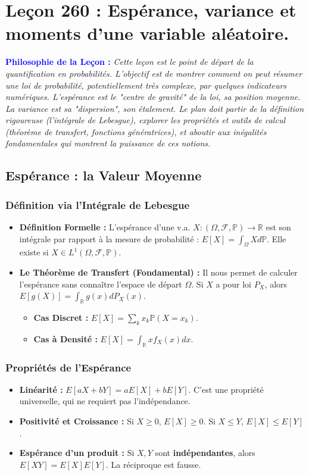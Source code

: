 \documentclass[12pt, a4paper, parskip=full]{report}
\theoremstyle{agregstyle}
\newenvironment{philosophie}
  {\par\medskip\noindent\begin{oframed}\noindent\textbf{\textcolor{blue}{Philosophie de la Leçon :}}\itshape}
  {\end{oframed}\par\medskip}
\begin{document}
\chapter{Leçon 260 : Espérance, variance et moments d'une variable aléatoire.}

\begin{philosophie}
    Cette leçon est le point de départ de la quantification en probabilités. L'objectif est de montrer comment on peut résumer une loi de probabilité, potentiellement très complexe, par quelques indicateurs numériques. L'espérance est le "centre de gravité" de la loi, sa position moyenne. La variance est sa "dispersion", son étalement. Le plan doit partir de la définition rigoureuse (l'intégrale de Lebesgue), explorer les propriétés et outils de calcul (théorème de transfert, fonctions génératrices), et aboutir aux inégalités fondamentales qui montrent la puissance de ces notions.
\end{philosophie}

\section{Espérance : la Valeur Moyenne}
\subsection{Définition via l'Intégrale de Lebesgue}
\begin{itemize}
    \item \textbf{Définition Formelle :} L'espérance d'une v.a. $X: (\Omega, \mathcal{F}, \mathbb{P}) \to \mathbb{R}$ est son intégrale par rapport à la mesure de probabilité : $E[X] = \int_\Omega X d\mathbb{P}$. Elle existe si $X \in L^1(\Omega, \mathcal{F}, \mathbb{P})$.
    \item \textbf{Le Théorème de Transfert (Fondamental) :} Il nous permet de calculer l'espérance sans connaître l'espace de départ $\Omega$. Si $X$ a pour loi $P_X$, alors $E[g(X)] = \int_\mathbb{R} g(x) dP_X(x)$.
        \begin{itemize}
            \item \textbf{Cas Discret :} $E[X] = \sum_k x_k \mathbb{P}(X=x_k)$.
            \item \textbf{Cas à Densité :} $E[X] = \int_\mathbb{R} x f_X(x)dx$.
        \end{itemize}
\end{itemize}
\subsection{Propriétés de l'Espérance}
\begin{itemize}
    \item \textbf{Linéarité :} $E[aX+bY] = aE[X]+bE[Y]$. C'est une propriété universelle, qui ne requiert pas l'indépendance.
    \item \textbf{Positivité et Croissance :} Si $X \ge 0$, $E[X] \ge 0$. Si $X \le Y$, $E[X] \le E[Y]$.
    \item \textbf{Espérance d'un produit :} Si $X,Y$ sont \textbf{indépendantes}, alors $E[XY]=E[X]E[Y]$. La réciproque est fausse.
\end{itemize}
\end{document}
